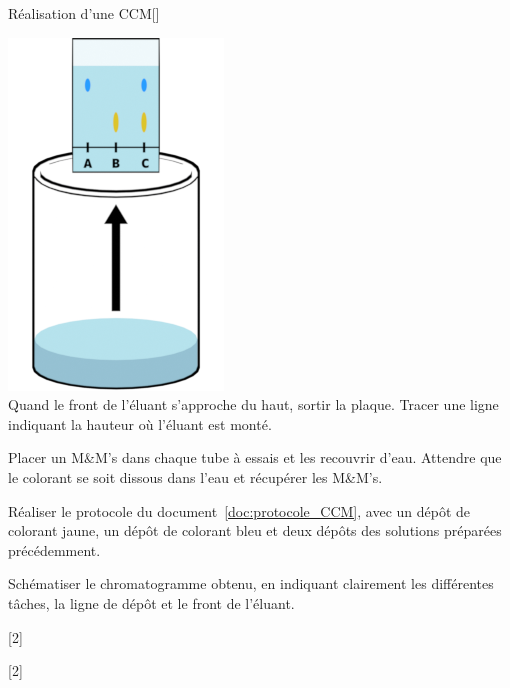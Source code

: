 \begin{doc}{Réalisation d'une CCM}[\label{doc:protocole_CCM}]
\begin{multicols}{2}
    \begin{center}
      \includegraphics[height=0.2\textheight]{images/chimie/CCM/CCM_protocole0006.png} \\      
      Quand le front de l'éluant s'approche du haut, sortir la plaque.
      Tracer une ligne indiquant la hauteur où l'éluant est monté.
    \end{center}
  \end{multicols}
\end{doc}


\mesure
Placer un M\&M's dans chaque tube à essais et les recouvrir d'eau.
Attendre que le colorant se soit dissous dans l'eau et récupérer les M\&M's.

\mesure
Réaliser le protocole du document~\ref{doc:protocole_CCM}, avec un dépôt de colorant jaune, un dépôt de colorant bleu et deux dépôts des solutions préparées précédemment.

\mesure
Schématiser le chromatogramme obtenu, en indiquant clairement les différentes tâches, la ligne de dépôt et le front de l'éluant.
\pasCorrection{\vfill}

[2]

[2]


